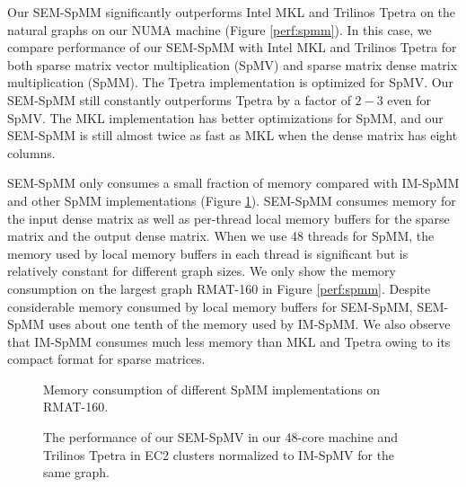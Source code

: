 Our SEM-SpMM significantly outperforms Intel MKL and Trilinos Tpetra on the natural
graphs on our NUMA machine (Figure \ref{perf:spmm}). In this case, we compare
performance of our SEM-SpMM with Intel MKL and Trilinos Tpetra for both sparse matrix
vector multiplication (SpMV) and sparse matrix dense matrix multiplication (SpMM).
The Tpetra implementation is optimized for SpMV. Our SEM-SpMM still
constantly outperforms Tpetra by a factor of $2-3$ even for SpMV. The MKL
implementation has better optimizations for SpMM, and our SEM-SpMM is still
almost twice as fast as MKL when the dense matrix has eight columns.

SEM-SpMM only consumes a small fraction of memory compared with IM-SpMM and
other SpMM implementations (Figure \ref{perf:spmm_mem}). SEM-SpMM consumes
memory for the input dense matrix as well as per-thread local memory buffers
for the sparse matrix and the output dense matrix. When we use 48 threads for
SpMM, the memory used by local memory buffers in each thread is significant
but is relatively constant for different graph sizes. We only show
the memory consumption on the largest graph RMAT-160 in Figure \ref{perf:spmm}.
Despite considerable memory consumed by
local memory buffers for SEM-SpMM, SEM-SpMM uses about one tenth of the memory
used by IM-SpMM. We also observe that IM-SpMM consumes much less memory than
MKL and Tpetra owing to its compact format for sparse matrices.

\begin{figure}
	\begin{center}
		\footnotesize
		
		\caption{Memory consumption of different SpMM implementations on
		RMAT-160.}
		\label{perf:spmm_mem}
	\end{center}
\end{figure}

\begin{figure}
	\begin{center}
		\footnotesize
		
		\caption{The performance of our SEM-SpMV in our 48-core machine
		and Trilinos Tpetra in EC2 clusters normalized to IM-SpMV for the same graph.}
		\label{perf:ec2}
	\end{center}
\end{figure}

